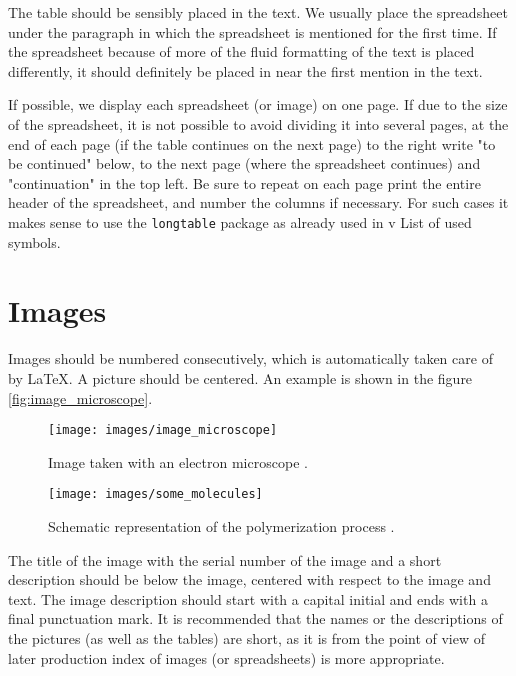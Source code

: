 The table should be sensibly placed in the text. We usually place the spreadsheet
under the paragraph in which the spreadsheet is mentioned for the first time. If the spreadsheet because of more
of the fluid formatting of the text is placed differently, it should definitely be placed in
near the first mention in the text.

If possible, we display each spreadsheet (or image) on one page. If
due to the size of the spreadsheet, it is not possible to avoid dividing it into several pages,
at the end of each page (if the table continues on the next page) to the right
write "to be continued" below, to the next page (where the spreadsheet
continues) and "continuation" in the top left. Be sure to repeat on each page
print the entire header of the spreadsheet, and number the columns if necessary. For such
cases it makes sense to use the \verb|longtable| package as already used in v
List of used symbols.

\section{Images}\label{sec:images}

Images should be numbered consecutively, which is automatically taken care of by \LaTeX. A picture
should be centered. An example is shown in the figure
\ref{fig:image_microscope}.

\begin{figure}[ht!]
\begin{centering}
\texttt{[image: images/image\_microscope]}
\caption{Image taken with an electron microscope
\cite{stropnik_1997}.}
\label{fig:picture_microscope}
\end{centering}
\end{figure}

\begin{figure}[ht!]
\begin{centering}
\texttt{[image: images/some\_molecules]}
\caption{Schematic representation of the polymerization process
\cite{stropnik_1997,Doe_1991}.} \label{fig:some_molecules}
\end{centering}
\end{figure}

The title of the image with the serial number of the image and a short description should be below the image,
centered with respect to the image and text. The image description should start with a capital
initial and ends with a final punctuation mark. It is recommended that the names or
the descriptions of the pictures (as well as the tables) are short, as it is from the point of view of later production
index of images (or spreadsheets) is more appropriate.

